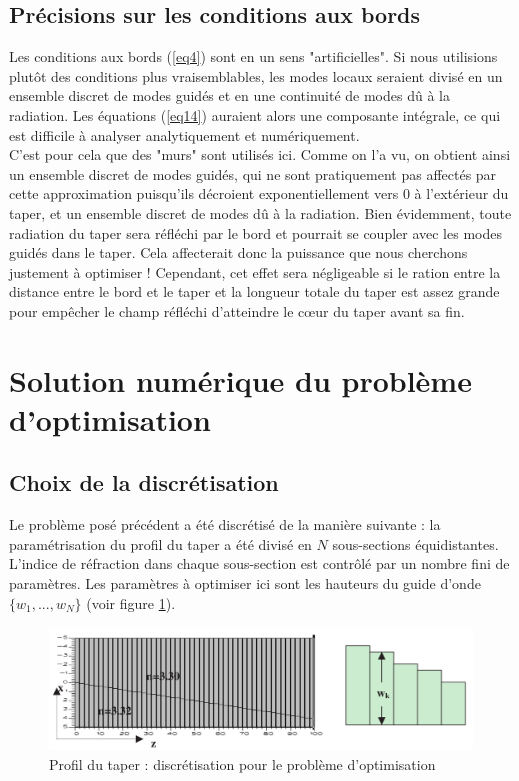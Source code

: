 \documentclass{article}
\begin{document}
\subsection{Précisions sur les conditions aux bords}
Les conditions aux bords (\ref{eq4}) sont en un sens "artificielles". Si nous utilisions plutôt des conditions plus vraisemblables, les modes locaux seraient divisé en un ensemble discret de modes guidés et en une continuité de modes dû à la radiation. Les équations (\ref{eq14}) auraient alors une composante intégrale, ce qui est difficile à analyser analytiquement et numériquement.\\
C'est pour cela que des "murs" sont utilisés ici. Comme on l'a vu, on obtient ainsi un ensemble discret de modes guidés, qui ne sont pratiquement pas affectés par cette approximation puisqu'ils décroient exponentiellement vers 0 à l'extérieur du taper, et un ensemble discret de modes dû à la radiation. Bien évidemment, toute radiation du taper sera réfléchi par le bord et pourrait se coupler avec les modes guidés dans le taper. Cela affecterait donc la puissance que nous cherchons justement à optimiser ! Cependant, cet effet sera négligeable si le ration entre la distance entre le bord et le taper et la longueur totale du taper est assez grande pour empêcher le champ réfléchi d'atteindre le c\oe ur du taper avant sa fin.

\section{Solution numérique du problème d'optimisation}
\subsection{Choix de la discrétisation}
Le problème posé précédent a été discrétisé de la manière suivante : la paramétrisation du profil du taper a été divisé en $N$ sous-sections équidistantes. L'indice de réfraction dans chaque sous-section est contrôlé par un nombre fini de paramètres. Les paramètres à optimiser ici sont les hauteurs du guide d'onde $\{w_1,...,w_N\}$ (voir figure \ref{fig:numOpti}).
\begin{figure}[!h]
	\centering
	\includegraphics[scale=0.25]{images/numOpti.png}
	\caption{Profil du taper : discrétisation pour le problème d'optimisation}
	\label{fig:numOpti}
\end{figure}
\end{document}
